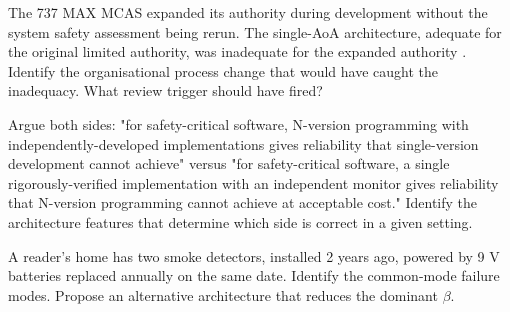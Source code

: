 \begin{exercise}
The 737 MAX MCAS expanded its authority during development without the system safety assessment being rerun. The single-AoA architecture, adequate for the original limited authority, was inadequate for the expanded authority \cite{acc:house-737max-2020}. Identify the organisational process change that would have caught the inadequacy. What review trigger should have fired?
\end{exercise}

\begin{exercise}
Argue both sides: "for safety-critical software, N-version programming with independently-developed implementations gives reliability that single-version development cannot achieve" versus "for safety-critical software, a single rigorously-verified implementation with an independent monitor gives reliability that N-version programming cannot achieve at acceptable cost." Identify the architecture features that determine which side is correct in a given setting.
\end{exercise}

\begin{exercise}
A reader's home has two smoke detectors, installed 2 years ago, powered by 9 V batteries replaced annually on the same date. Identify the common-mode failure modes. Propose an alternative architecture that reduces the dominant $\beta$.
\end{exercise}

